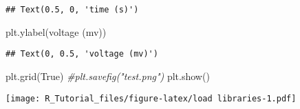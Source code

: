 \documentclass[
]{article}
\newenvironment{Shaded}{\begin{snugshade}}{\end{snugshade}}
\newcommand{\CommentTok}[1]{\textcolor[rgb]{0.56,0.35,0.01}{\textit{#1}}}
\newcommand{\NormalTok}[1]{#1}
\newcommand{\StringTok}[1]{\textcolor[rgb]{0.31,0.60,0.02}{#1}}
\newcommand{\VariableTok}[1]{\textcolor[rgb]{0.00,0.00,0.00}{#1}}
\begin{document}
\begin{verbatim}
## Text(0.5, 0, 'time (s)')
\end{verbatim}

\begin{Shaded}
\begin{Highlighting}[]
\NormalTok{plt.ylabel(}\StringTok{\textquotesingle{}voltage (mv)\textquotesingle{}}\NormalTok{)}
\end{Highlighting}
\end{Shaded}

\begin{verbatim}
## Text(0, 0.5, 'voltage (mv)')
\end{verbatim}

\begin{Shaded}
\begin{Highlighting}[]
\NormalTok{plt.grid(}\VariableTok{True}\NormalTok{)}
\CommentTok{\#plt.savefig("test.png")}
\NormalTok{plt.show()}
\end{Highlighting}
\end{Shaded}

\texttt{[image: R\_Tutorial\_files/figure-latex/load libraries-1.pdf]}
\end{document}

